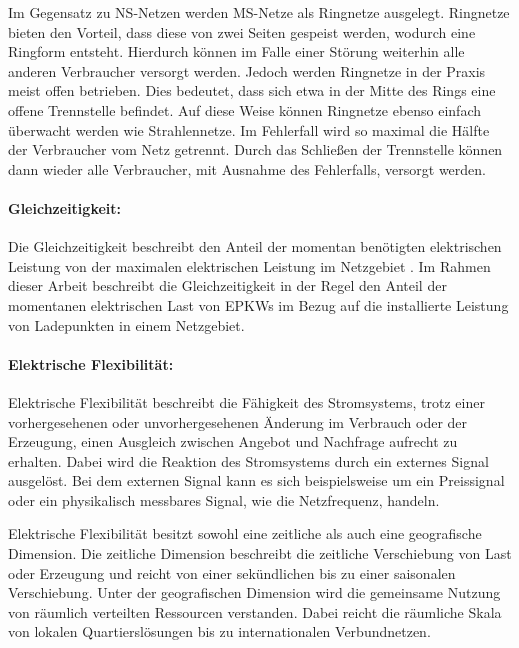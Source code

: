 Im Gegensatz zu \gls{NS}-Netzen werden \gls{MS}-Netze als Ringnetze ausgelegt.
Ringnetze bieten den Vorteil, dass diese von zwei Seiten gespeist werden, wodurch eine Ringform entsteht.
Hierdurch können im Falle einer Störung weiterhin alle anderen Verbraucher versorgt werden.
Jedoch werden Ringnetze in der Praxis meist offen betrieben.
Dies bedeutet, dass sich etwa in der Mitte des Rings eine offene Trennstelle befindet.
Auf diese Weise können Ringnetze ebenso einfach überwacht werden wie Strahlennetze.
Im Fehlerfall wird so maximal die Hälfte der Verbraucher vom Netz getrennt.
Durch das Schließen der Trennstelle können dann wieder alle Verbraucher, mit Ausnahme des Fehlerfalls, versorgt werden. \cite{WNG2020} \cite{Westermann2019}


\paragraph{Gleichzeitigkeit:}

Die Gleichzeitigkeit beschreibt den Anteil der momentan benötigten elektrischen Leistung von der maximalen elektrischen Leistung im Netzgebiet \cite{Agora2019}.
Im Rahmen dieser Arbeit beschreibt die Gleichzeitigkeit in der Regel den Anteil der momentanen elektrischen Last von \glspl{EPKW} im Bezug auf die installierte Leistung von Ladepunkten in einem Netzgebiet.


\paragraph{Elektrische Flexibilität:}

Elektrische Flexibilität beschreibt die Fähigkeit des Stromsystems, trotz einer vorhergesehenen oder unvorhergesehenen Änderung im Verbrauch oder der Erzeugung, einen Ausgleich zwischen Angebot und Nachfrage aufrecht zu erhalten.
Dabei wird die Reaktion des Stromsystems durch ein externes Signal ausgelöst.
Bei dem externen Signal kann es sich beispielsweise um ein Preissignal oder ein physikalisch messbares Signal, wie die Netzfrequenz, handeln. \cite{BNetzA2017} \cite{IEA2014}\medskip

Elektrische Flexibilität besitzt sowohl eine zeitliche als auch eine geografische Dimension.
Die zeitliche Dimension beschreibt die zeitliche Verschiebung von Last oder Erzeugung und reicht von einer sekündlichen bis zu einer saisonalen Verschiebung.
Unter der geografischen Dimension wird die gemeinsame Nutzung von räumlich verteilten Ressourcen verstanden.
Dabei reicht die räumliche Skala von lokalen Quartierslösungen bis zu internationalen Verbundnetzen. \cite{BNetzA2017} \cite{IEA2014}


